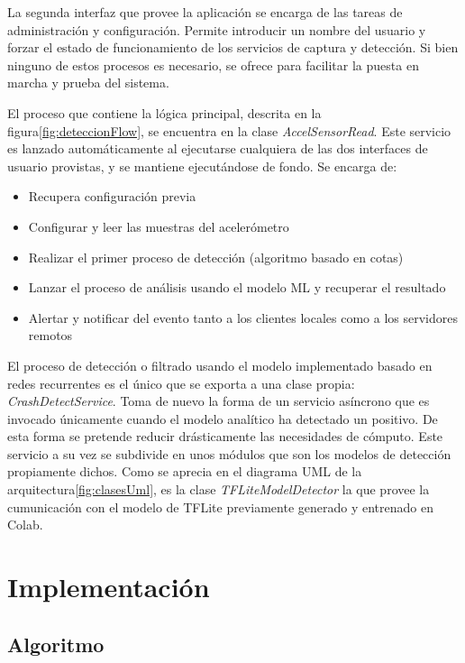 \documentclass[../tfm.tex]{subfiles}
\begin{document}
La segunda interfaz que provee la aplicación se encarga de las tareas de administración y configuración. Permite introducir un nombre del usuario y forzar el estado de funcionamiento de los servicios de captura y detección. Si bien ninguno de estos procesos es necesario, se ofrece para facilitar la puesta en marcha y prueba del sistema.

El proceso que contiene la lógica principal, descrita en la figura\ref{fig:deteccionFlow}, se encuentra en la clase \textit{AccelSensorRead}. Este servicio es lanzado automáticamente al ejecutarse cualquiera de las dos interfaces de usuario provistas, y se mantiene ejecutándose de fondo. Se encarga de:

\begin{itemize}
  \item Recupera configuración previa
  \item Configurar y leer las muestras del acelerómetro
  \item Realizar el primer proceso de detección (algoritmo basado en cotas)
  \item Lanzar el proceso de análisis usando el modelo ML y recuperar el resultado
  \item Alertar y notificar del evento tanto a los clientes locales como a los servidores remotos
\end{itemize}

El proceso de detección o filtrado usando el modelo implementado basado en redes recurrentes es el único que se exporta a una clase propia: \textit{CrashDetectService}. Toma de nuevo la forma de un servicio asíncrono que es invocado únicamente cuando el modelo analítico ha detectado un positivo. De esta forma se pretende reducir drásticamente las necesidades de cómputo. Este servicio a su vez se subdivide en unos módulos que son los modelos de detección propiamente dichos. Como se aprecia en el diagrama UML de la arquitectura\ref{fig:clasesUml}, es la clase \textit{TFLiteModelDetector} la que provee la cumunicación con el modelo de TFLite previamente generado y entrenado en Colab.

\section{Implementación}

\subsection{Algoritmo}
\end{document}
